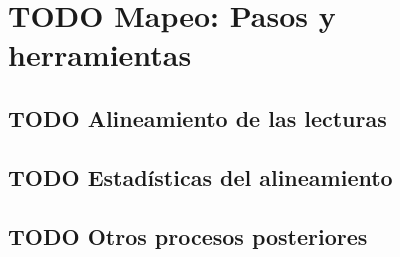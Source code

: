 \documentclass[11pt]{article}
\begin{document}
\section{{\bfseries\sffamily TODO} Mapeo: Pasos y herramientas}
\label{sec:org6b7b8e7}
\subsection{{\bfseries\sffamily TODO} Alineamiento de las lecturas}
\label{sec:orgf981491}
\subsection{{\bfseries\sffamily TODO} Estadísticas del alineamiento}
\label{sec:org72fa52c}
\subsection{{\bfseries\sffamily TODO} Otros procesos posteriores}
\label{sec:org9ff5a8b}
\end{document}
